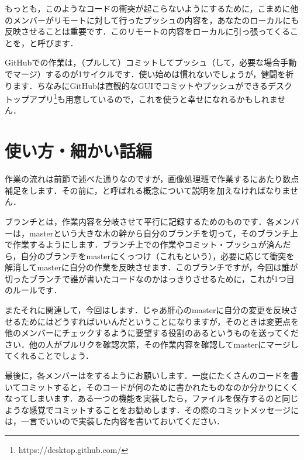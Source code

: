 \documentclass{jsarticle}
\begin{document}
もっとも，このようなコードの衝突が起こらないようにするために，こまめに他のメンバーがリモートに対して行ったプッシュの内容を，あなたのローカルにも反映させることは重要です．このリモートの内容をローカルに引っ張ってくることを，と呼びます．

GitHubでの作業は，（プルして）コミットしてプッシュ（して，必要な場合手動でマージ）するのが1サイクルです．使い始めは慣れないでしょうが，健闘を祈ります．ちなみにGitHubは直観的なGUIでコミットやプッシュができるデスクトップアプリ\footnote{https://desktop.github.com/}も用意しているので，これを使うと幸せになれるかもしれません．
\section{使い方・細かい話編}
作業の流れは前節で述べた通りなのですが，画像処理班で作業するにあたり数点補足をします．その前に，と呼ばれる概念について説明を加えなければなりません．

ブランチとは，作業内容を分岐させて平行に記録するためのものです．各メンバーは，masterという大きな木の幹から自分のブランチを切って，そのブランチ上で作業するようにします．ブランチ上での作業やコミット・プッシュが済んだら，自分のブランチをmasterにくっつけ（これもという），必要に応じて衝突を解消してmasterに自分の作業を反映させます．このブランチですが，今回は誰が切ったブランチで誰が書いたコードなのかはっきりさせるために，これが1つ目のルールです．

またそれに関連して，今回はします．じゃあ肝心のmasterに自分の変更を反映させるためにはどうすればいいんだということになりますが，そのときは変更点を他のメンバーにチェックするように要望する役割のあるというものを送ってください．他の人がプルリクを確認次第，その作業内容を確認してmasterにマージしてくれることでしょう．

最後に，各メンバーはをするようにお願いします．一度にたくさんのコードを書いてコミットすると，そのコードが何のために書かれたものなのか分かりにくくなってしまいます．ある一つの機能を実装したら，ファイルを保存するのと同じような感覚でコミットすることをお勧めします．その際のコミットメッセージには，一言でいいので実装した内容を書いておいてください．
\end{document}
